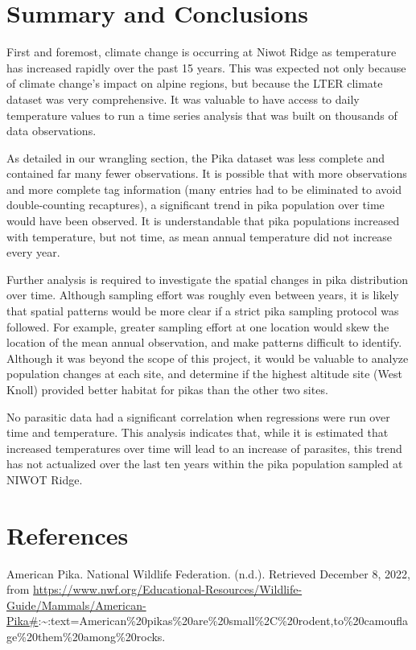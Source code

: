 \documentclass[
  12pt,
]{article}
\begin{document}
\newpage

\hypertarget{summary-and-conclusions}{%
\section{Summary and Conclusions}\label{summary-and-conclusions}}

First and foremost, climate change is occurring at Niwot Ridge as
temperature has increased rapidly over the past 15 years. This was
expected not only because of climate change's impact on alpine regions,
but because the LTER climate dataset was very comprehensive. It was
valuable to have access to daily temperature values to run a time series
analysis that was built on thousands of data observations.

As detailed in our wrangling section, the Pika dataset was less complete
and contained far many fewer observations. It is possible that with more
observations and more complete tag information (many entries had to be
eliminated to avoid double-counting recaptures), a significant trend in
pika population over time would have been observed. It is understandable
that pika populations increased with temperature, but not time, as mean
annual temperature did not increase every year.

Further analysis is required to investigate the spatial changes in pika
distribution over time. Although sampling effort was roughly even
between years, it is likely that spatial patterns would be more clear if
a strict pika sampling protocol was followed. For example, greater
sampling effort at one location would skew the location of the mean
annual observation, and make patterns difficult to identify. Although it
was beyond the scope of this project, it would be valuable to analyze
population changes at each site, and determine if the highest altitude
site (West Knoll) provided better habitat for pikas than the other two
sites.

No parasitic data had a significant correlation when regressions were
run over time and temperature. This analysis indicates that, while it is
estimated that increased temperatures over time will lead to an increase
of parasites, this trend has not actualized over the last ten years
within the pika population sampled at NIWOT Ridge.

\newpage

\hypertarget{references}{%
\section{References}\label{references}}

American Pika. National Wildlife Federation. (n.d.). Retrieved December
8, 2022, from
\url{https://www.nwf.org/Educational-Resources/Wildlife-Guide/Mammals/American-Pika\#}:\textasciitilde:text=American\%20pikas\%20are\%20small\%2C\%20rodent,to\%20camouflage\%20them\%20among\%20rocks.
\end{document}
